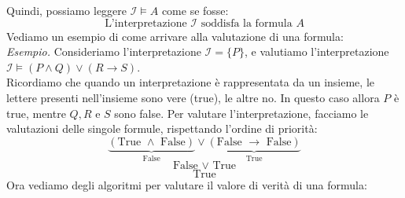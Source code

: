 Quindi, possiamo leggere $\mathcal{I} \models A$ come se fosse:
\[  \text{L'interpretazione } \mathcal{I} \text{ soddisfa la formula } A   \]
Vediamo un esempio di come arrivare alla valutazione di una formula:\smallskip\\
\textit{Esempio.} Consideriamo l'interpretazione $\mathcal{I} = \{ P  \}$, e valutiamo l'interpretazione $\mathcal{I} \models (P \wedge Q) \vee (R \to S) $.\\
Ricordiamo che quando un interpretazione è rappresentata da un insieme, le lettere presenti nell'insieme sono vere (true), le altre no.
In questo caso allora $P$ è true, mentre $Q,R$ e $S$ sono false. Per valutare l'interpretazione, facciamo le valutazioni delle singole formule, rispettando l'ordine di priorità:
\[   \underbrace{(\text{True } \wedge \text{ False})}_{\text{False}}  \vee \underbrace{(\text{False }\to \text{ False})}_{\text{True}}   \]
\[ \text{False } \vee \text{ True}  \]
\[   \boxed{\text{True}} \] 
Ora vediamo degli algoritmi  per valutare il valore di verità di una formula:  




